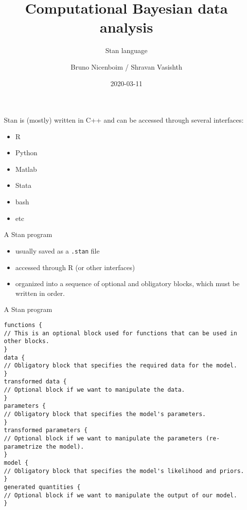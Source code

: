 \documentclass[12pt,ignorenonframetext,aspectratio=169]{beamer}
\title{Computational Bayesian data analysis}
\subtitle{Stan language}
\author{Bruno Nicenboim / Shravan Vasishth}
\date{2020-03-11}
\providecommand{\tightlist}{%
  \setlength{\itemsep}{0pt}\setlength{\parskip}{0pt}}
\begin{document}
\frame{\titlepage}

\begin{frame}
\tableofcontents[hideallsubsections]
\end{frame}
\begin{frame}

Stan is (mostly) written in C++ and can be accessed through several interfaces:

\begin{itemize}
\tightlist
\item
  R
\item
  Python
\item
  Matlab
\item
  Stata
\item
  bash
\item
  etc
\end{itemize}

\end{frame}

\begin{frame}[fragile]{A Stan program}
\protect\hypertarget{a-stan-program}{}

\begin{itemize}
\tightlist
\item
  usually saved as a \texttt{.stan} file
\item
  accessed through R (or other interfaces)
\item
  organized into a sequence of optional and obligatory blocks, which must be written in order.
\end{itemize}

\end{frame}

\begin{frame}[fragile]{A Stan program}
\protect\hypertarget{a-stan-program-1}{}

\tiny

\begin{verbatim}
functions {
// This is an optional block used for functions that can be used in other blocks.
}
data {
// Obligatory block that specifies the required data for the model.
}
transformed data {
// Optional block if we want to manipulate the data.
}
parameters {
// Obligatory block that specifies the model's parameters.
}
transformed parameters {
// Optional block if we want to manipulate the parameters (re-parametrize the model).
}
model {
// Obligatory block that specifies the model's likelihood and priors.
}
generated quantities {
// Optional block if we want to manipulate the output of our model.
}
\end{verbatim}

\end{frame}
\end{document}
